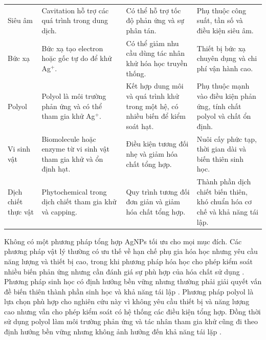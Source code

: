 \begin{longtable}{@{}>{\raggedright\arraybackslash}p{}>{\raggedright\arraybackslash}p{}>{\raggedright\arraybackslash}p{}>{\raggedright\arraybackslash}p{}@{}}
Siêu âm & Cavitation hỗ trợ các quá trình trong dung dịch. & Có thể hỗ trợ tốc độ phản ứng và sự phân tán. & Phụ thuộc công suất, tần số và điều kiện siêu âm. \\
Bức xạ & Bức xạ tạo electron hoặc gốc tự do để khử Ag$^+$. & Có thể giảm nhu cầu dùng tác nhân khử hóa học truyền thống. & Thiết bị bức xạ chuyên dụng và chi phí vận hành cao. \\
Polyol & Polyol là môi trường phản ứng và có thể tham gia khử Ag$^+$. & Kết hợp dung môi và quá trình khử trong một hệ, có nhiều biến để kiểm soát hạt. & Phụ thuộc mạnh vào điều kiện phản ứng, tính chất polyol và chất ổn định. \\
Vi sinh vật & Biomolecule hoặc enzyme từ vi sinh vật tham gia khử và ổn định hạt. & Điều kiện tương đối nhẹ và giảm hóa chất tổng hợp. & Nuôi cấy phức tạp, thời gian dài và biến thiên sinh học. \\
Dịch chiết thực vật & Phytochemical trong dịch chiết tham gia khử và capping. & Quy trình tương đối đơn giản và giảm hóa chất tổng hợp. & Thành phần dịch chiết biến thiên, khó chuẩn hóa cơ chế và khả năng tái lập. \\
\end{longtable}
\endgroup

Không có một phương pháp tổng hợp AgNPs tối ưu cho mọi mục đích.
Các phương pháp vật lý thường có ưu thế về hạn chế phụ gia hóa học nhưng yêu cầu năng lượng và thiết bị cao, trong khi phương pháp hóa học cho phép kiểm soát nhiều biến phản ứng nhưng cần đánh giá sự phù hợp của hóa chất sử dụng \parencite{lee2019,nguyen2023}.
Phương pháp sinh học có định hướng bền vững nhưng thường phải giải quyết vấn đề biến thiên thành phần sinh học và khả năng tái lập \parencite{siddiqi2018}.
Phương pháp polyol là lựa chọn phù hợp cho nghiên cứu này vì không yêu cầu thiết bị và năng lượng cao nhưng vẫn cho phép kiểm soát có hệ thống các điều kiện tổng hợp. 
Đồng thời sử dụng polyol làm môi trường phản ứng và tác nhân tham gia khử cũng đi theo định hướng bền vững nhưng không ảnh hưởng đến khả năng tái lặp \parencite{wolf2022,liu2020glycerol}.

